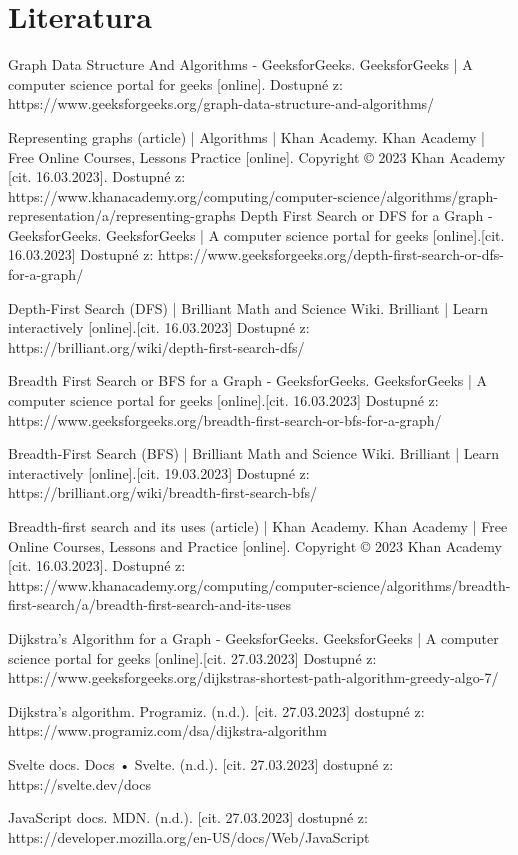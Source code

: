 \documentclass[12pt, titlepage, a4paper]{article}
\begin{document}
\section{Literatura}
\begin{thebibliography}{99}
    Graph Data Structure And Algorithms - GeeksforGeeks. GeeksforGeeks | A computer science 
    portal for geeks [online]. Dostupné z: https://www.geeksforgeeks.org/graph-data-structure-and-algorithms/

    Representing graphs (article) | Algorithms | Khan Academy. Khan Academy | Free Online Courses, 
    Lessons Practice [online]. Copyright © 2023 Khan Academy [cit. 16.03.2023]. Dostupné z: https://www.khanacademy.org/computing/computer-science/algorithms/graph-representation/a/representing-graphs
    Depth First Search or DFS for a Graph - GeeksforGeeks. GeeksforGeeks | A computer science portal for geeks [online].[cit. 16.03.2023] Dostupné z: https://www.geeksforgeeks.org/depth-first-search-or-dfs-for-a-graph/
    
    Depth-First Search (DFS) | Brilliant Math and Science Wiki. Brilliant | Learn interactively [online].[cit. 16.03.2023] Dostupné z: https://brilliant.org/wiki/depth-first-search-dfs/

    Breadth First Search or BFS for a Graph - GeeksforGeeks. GeeksforGeeks | A computer science portal for geeks [online].[cit. 16.03.2023] Dostupné z: https://www.geeksforgeeks.org/breadth-first-search-or-bfs-for-a-graph/

    Breadth-First Search (BFS) | Brilliant Math and Science Wiki. Brilliant | Learn interactively [online].[cit. 19.03.2023] Dostupné z: https://brilliant.org/wiki/breadth-first-search-bfs/

    Breadth-first search and its uses (article) | Khan Academy. Khan Academy | Free Online Courses, Lessons and Practice [online]. Copyright © 2023 Khan Academy [cit. 16.03.2023]. Dostupné z: https://www.khanacademy.org/computing/computer-science/algorithms/breadth-first-search/a/breadth-first-search-and-its-uses

    Dijkstra’s Algorithm for a Graph - GeeksforGeeks. GeeksforGeeks | A computer science portal for geeks [online].[cit. 27.03.2023] Dostupné z: https://www.geeksforgeeks.org/dijkstras-shortest-path-algorithm-greedy-algo-7/

    Dijkstra's algorithm. Programiz. (n.d.). [cit. 27.03.2023] dostupné z: https://www.programiz.com/dsa/dijkstra-algorithm 

    Svelte docs. Docs • Svelte. (n.d.). [cit. 27.03.2023] dostupné z: https://svelte.dev/docs 

    \bibitem{}
    JavaScript docs. MDN. (n.d.). [cit. 27.03.2023] dostupné z: https://developer.mozilla.org/en-US/docs/Web/JavaScript 



\end{thebibliography}
\end{document}
